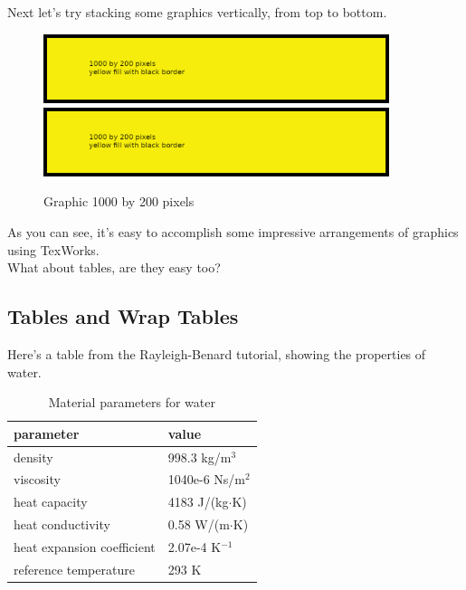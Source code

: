 Next let's try stacking some graphics vertically, from top to bottom.
\begin{figure}[H]
\centering
\includegraphics[width=0.9\textwidth]{1000x200}
\includegraphics[width=0.9\textwidth]{1000x200}
\caption{Graphic 1000 by 200 pixels}\label{fg:1000x200-5}
\end{figure}

As you can see, it's easy to accomplish some impressive arrangements of graphics using TexWorks.\\

What about tables, are they easy too?

\newpage

\subsection*{Tables and Wrap Tables}

Here's a table from the Rayleigh-Benard tutorial, showing the properties of water.\\

\begin{table}[h]
\caption{Material parameters for water}
\label{tb:matpar}
\centering
\begin{tabular}{ll} \hline
parameter  & value \\ \hline
density & 998.3 kg/m$^{3}$ \\
viscosity & 1040e-6 Ns/m$^{2}$ \\
heat capacity & 4183 J/(kg$\cdot$K) \\
heat conductivity & 0.58 W/(m$\cdot$K)       \\
heat expansion coefficient & 2.07e-4 K$^{-1}$      \\ 
reference temperature & 293 K       \\ \hline
\end{tabular}
\end{table}

